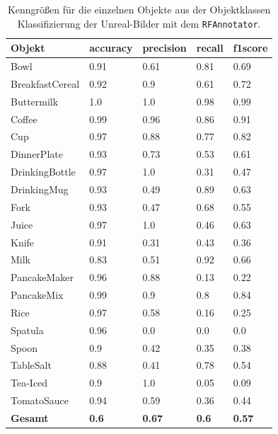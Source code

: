 \begin{table}
\centering
\small
{}
\begin{tabularx}{\textwidth}{Xllll}
\textbf{Objekt}	& \textbf{\gls{accuracy}} & \textbf{\gls{precision}}	& \textbf{\gls{recall}}	& \textbf{\gls{f1score}} \\ \hline
Bowl & 0.91 & 0.61 & 0.81 & 0.69 \\  
BreakfastCereal & 0.92 & 0.9 & 0.61 & 0.72 \\  
Buttermilk & 1.0 & 1.0 & 0.98 & 0.99 \\  
Coffee & 0.99 & 0.96 & 0.86 & 0.91 \\  
Cup & 0.97 & 0.88 & 0.77 & 0.82 \\  
DinnerPlate & 0.93 & 0.73 & 0.53 & 0.61 \\  
DrinkingBottle & 0.97 & 1.0 & 0.31 & 0.47 \\  
DrinkingMug & 0.93 & 0.49 & 0.89 & 0.63 \\  
Fork & 0.93 & 0.47 & 0.68 & 0.55 \\  
Juice & 0.97 & 1.0 & 0.46 & 0.63 \\  
Knife & 0.91 & 0.31 & 0.43 & 0.36 \\  
Milk & 0.83 & 0.51 & 0.92 & 0.66 \\  
PancakeMaker & 0.96 & 0.88 & 0.13 & 0.22 \\  
PancakeMix & 0.99 & 0.9 & 0.8 & 0.84 \\  
Rice & 0.97 & 0.58 & 0.16 & 0.25 \\  
Spatula & 0.96 & 0.0 & 0.0 & 0.0 \\  
Spoon & 0.9 & 0.42 & 0.35 & 0.38 \\  
TableSalt & 0.88 & 0.41 & 0.78 & 0.54 \\  
Tea-Iced & 0.9 & 1.0 & 0.05 & 0.09 \\  
TomatoSauce & 0.94 & 0.59 & 0.36 & 0.44 \\  \hline
\textbf{Gesamt}		&	\textbf{0.6}   &	\textbf{0.67}  & \textbf{0.6}     &  \textbf{0.57}     \\
\end{tabularx}
\caption[Objektklassen-spezifische Kenngrößen des RFAnnotators]{Kenngrößen für die einzelnen Objekte aus der Objektklassen Klassifizierung der Unreal-Bilder mit dem \texttt{RFAnnotator}.}
\label{tab:RFClassifierGTClass_metrics}
\end{table}

